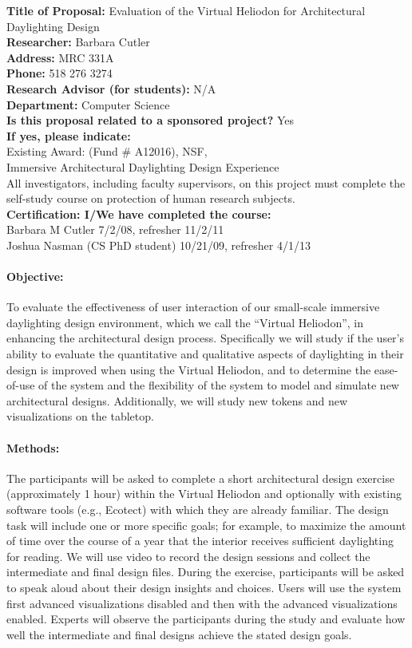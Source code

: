 \documentclass[10pt]{article}
\begin{document}
\noindent
{\bf Title of Proposal:}  Evaluation of the Virtual Heliodon for Architectural Daylighting Design\\
{\bf Researcher:}   Barbara Cutler\\
{\bf Address:}  MRC 331A\\
{\bf Phone:} 518 276 3274\\
{\bf Research Advisor (for students):}  N/A \\
{\bf Department:}  Computer Science \\
{\bf Is this proposal related to a sponsored project?}  Yes \\
{\bf If yes,  please indicate:}  \\
Existing Award: (Fund \# A12016), NSF, \\
Immersive Architectural Daylighting Design Experience \\

\noindent
All investigators, including faculty supervisors, on this project must
complete the self-study course on protection of human research
subjects. \\
{\bf Certification:  I/We have completed the course:} \\
Barbara M Cutler 7/2/08, refresher 11/2/11 \\
Joshua Nasman (CS PhD student) 10/21/09, refresher 4/1/13

\paragraph{Objective:}
%
To evaluate the effectiveness of user interaction of our small-scale immersive daylighting design environment,
which we call the “Virtual Heliodon”, in enhancing the architectural design process. Specifically we will
study if the user’s ability to evaluate the quantitative and qualitative aspects of daylighting in their design
is improved when using the Virtual Heliodon, and to determine the ease-of-use of the system and the
flexibility of the system to model and simulate new architectural designs.  Additionally, we will study 
new tokens and new visualizations on the tabletop.



\paragraph{Methods:}
%
The participants will be asked to complete a short architectural design exercise (approximately
1 hour) within the Virtual Heliodon and optionally with existing software tools (e.g., Ecotect) with which
they are already familiar. The design task will include one or more specific goals; for example, to maximize
the amount of time over the course of a year that the interior receives sufficient daylighting for reading.
We will use video to record the design sessions and collect the intermediate and final design files. During
the exercise, participants will be asked to speak aloud about their design insights and choices. Users will use
the system first advanced visualizations disabled and then with the advanced visualizations enabled.
Experts will observe the participants during the study and evaluate how well the intermediate and final designs
achieve the stated design goals. 
\end{document}
